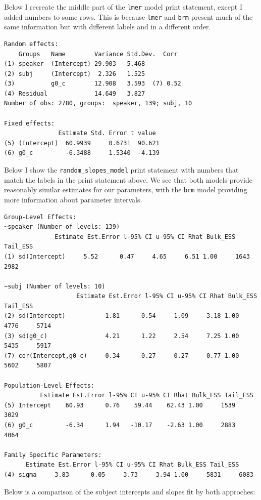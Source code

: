 \documentclass[
]{book}
\begin{document}
Below I recreate the middle part of the \texttt{lmer} model print statement, except I added numbers to some rows. This is because \texttt{lmer} and \texttt{brm} present much of the same information but with different labels and in a different order.

\begin{verbatim}
Random effects:
    Groups   Name        Variance Std.Dev.  Corr
(1) speaker  (Intercept) 29.903   5.468        
(2) subj     (Intercept)  2.326   1.525        
(3)          g0_c        12.908   3.593  (7) 0.52
(4) Residual             14.649   3.827        
Number of obs: 2780, groups:  speaker, 139; subj, 10

Fixed effects:
               Estimate Std. Error t value
(5) (Intercept)  60.9939     0.6731  90.621
(6) g0_c         -6.3488     1.5340  -4.139
\end{verbatim}

Below I show the \texttt{random\_slopes\_model} print statement with numbers that match the labels in the print statement above. We see that both models provide reasonably similar estimates for our parameters, with the \texttt{brm} model providing more information about parameter intervals.

\begin{verbatim}
Group-Level Effects: 
~speaker (Number of levels: 139) 
              Estimate Est.Error l-95% CI u-95% CI Rhat Bulk_ESS Tail_ESS
(1) sd(Intercept)     5.52      0.47     4.65     6.51 1.00     1643     2982

~subj (Number of levels: 10) 
                    Estimate Est.Error l-95% CI u-95% CI Rhat Bulk_ESS Tail_ESS
(2) sd(Intercept)           1.81      0.54     1.09     3.18 1.00     4776     5714
(3) sd(g0_c)                4.21      1.22     2.54     7.25 1.00     5435     5917
(7) cor(Intercept,g0_c)     0.34      0.27    -0.27     0.77 1.00     5602     5807

Population-Level Effects: 
          Estimate Est.Error l-95% CI u-95% CI Rhat Bulk_ESS Tail_ESS
(5) Intercept    60.93      0.76    59.44    62.43 1.00     1539     3029
(6) g0_c         -6.34      1.94   -10.17    -2.63 1.00     2883     4064

Family Specific Parameters: 
      Estimate Est.Error l-95% CI u-95% CI Rhat Bulk_ESS Tail_ESS
(4) sigma     3.83      0.05     3.73     3.94 1.00     5831     6083
\end{verbatim}

Below is a comparison of the subject intercepts and slopes fit by both approches:
\end{document}
